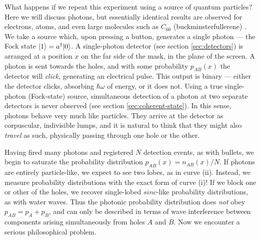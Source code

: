 What happens if we repeat this experiment using a source of quantum particles? Here we will discuss photons, but essentially identical results are observed for electrons, atoms, and even large molecules such as $C_{60}$ (buckminsterfullerene) \cite{Arndt1999}.  
We take a source which, upon pressing a button, generates a single photon --- the Fock state $\mbox{$ | 1 \rangle $} = a^\dagger \mbox{$ | 0 \rangle $}$. A single-photon detector (see section \ref{sec:detectors}) is arranged at a position $x$ on the far side of the mask, in the plane of the screen. 
A photon is sent towards the holes,
and with some probability $p_{AB}(x)$ the detector will \emph{click}, generating an electrical pulse.  This output is binary --- either the detector clicks, absorbing $\hbar \omega$ of energy, or it does not. Using a true single-photon (Fock-state) source, simultaneous detection of a photon at two separate detectors is never observed (see section \ref{sec:coherent-state}). In this sense, photons behave very much like particles. They arrive at the detector as corpuscular, indivisible lumps, and it is natural to think that they might also \emph{travel} as such, physically passing through one hole or the other.

Having fired many photons and registered $N$ detection events, as with bullets, we begin to saturate the probability distribution $p_{AB}(x) = n_{AB}(x)/N$. If photons are entirely particle-like, we expect to see two lobes, as in curve (ii). Instead, we measure probability distributions with the exact form of curve (i)! If we block one or other of the holes, we recover single-lobed $sinc$-like probability distributions, as with water waves.  Thus the photonic probability distribution does \emph{not} obey $p_{AB} = p_{A}+p_{B}$, and can only be described in terms of wave interference between components arising simultaneously from holes $A$ and $B$. Now we encounter a serious philosophical problem. 

